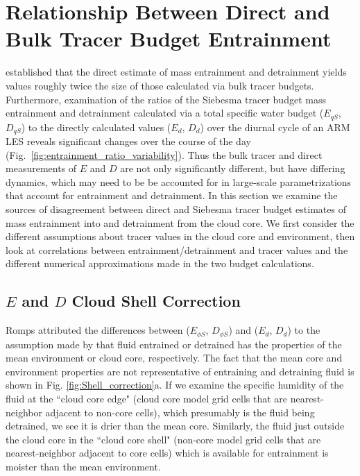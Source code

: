 \documentclass[12pt]{article}
\begin{document}

\section{Relationship Between Direct and Bulk Tracer Budget Entrainment}

\cite{Romps2010} established that the direct estimate of mass
entrainment and detrainment yields values roughly twice the size of
those calculated via bulk tracer budgets.  Furthermore, examination of
the ratios of the Siebesma tracer budget mass entrainment and detrainment
calculated via a total specific water budget ($E_{qS}$, $D_{qS}$) to the
directly calculated values ($E_d$, $D_d$) over the diurnal cycle of an
ARM LES reveals significant changes over the course of the day
(Fig.~\ref{fig:entrainment_ratio_variability}).  Thus the bulk tracer
and direct measurements of $E$ and $D$ are not only significantly
different, but have differing dynamics, which may need to be be accounted for
in large-scale parametrizations that account for entrainment and
detrainment.  In this section we examine the sources of disagreement
between direct and Siebesma tracer budget estimates of mass
entrainment into and detrainment from the cloud core. We first
consider the different assumptions about tracer values in the cloud
core and environment, then look at correlations between
entrainment/detrainment and tracer values and the different numerical
approximations made in the two budget calculations.


\subsection{$E$ and $D$ Cloud Shell Correction}

Romps attributed the differences between ($E_{\phi S}$, $D_{\phi S}$)
and ($E_d$, $D_d$) to the assumption made by \cite{Siebesma1995} that
fluid entrained or detrained has the properties of the mean
environment or cloud core, respectively.  The fact that the mean core
and environment properties are not representative of entraining and
detraining fluid is shown in Fig. \ref{fig:Shell_correction}a. If we
examine the specific humidity of the fluid at the ``cloud core edge"
(cloud core model grid cells that are nearest-neighbor adjacent to
non-core cells), which presumably is the fluid being detrained, we see
it is drier than the mean core.  Similarly, the fluid just outside the
cloud core in the ``cloud core shell" (non-core model grid cells that
are nearest-neighbor adjacent to core cells) which is available for
entrainment is moister than the mean environment.
\end{document}
